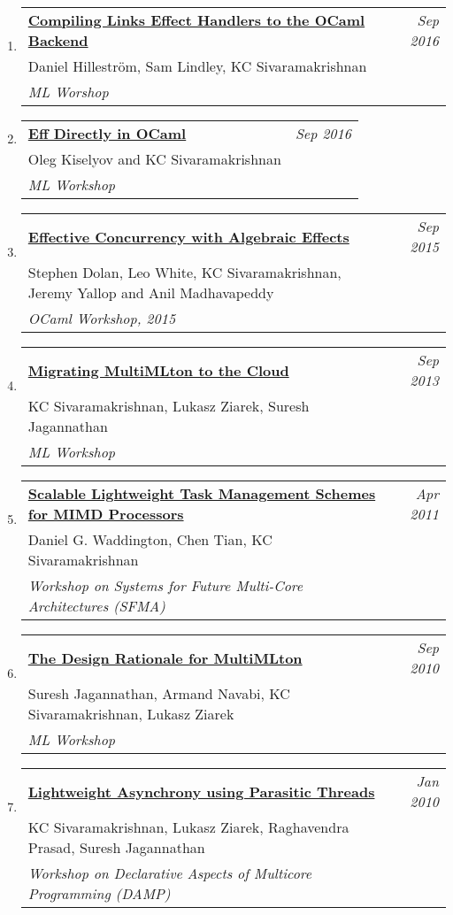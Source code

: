 \documentclass[10pt]{article}
\makeatletter
\newcommand{\lbar}[1]{{\color{#1}\ding{118}}\hspace*{2pt}}
\newenvironment{benumerate}[2]{
    \let\oldItem\item
    \def\item{\addtocounter{enumi}{-2}\oldItem}
    \begin{enumerate}[#2] \itemsep3pt
    \setcounter{enumi}{#1}
    \addtocounter{enumi}{1}}
  {\end{enumerate}}
\newenvironment{publication}[5]
{ \item
  \begin{tabular*}{7.5in}{p{6.3in}@{\extracolsep{\fill}}r}
    \href{#1}{\textbf{#2}} & \textit{#3}\\ #4 &\\ \textit{#5}&\\
  \end{tabular*}
} {}
\newenvironment{region}[3]{%
  \vspace*{0.5ex}
  {\scalebox{1.4}{\textbf{#1}}}
  \begin{benumerate}{#3}{\color{RoyalBlue}#2}}
  {\end{benumerate}\vspace{0.8ex}}
\makeatother
\begin{document}
\begin{region} {\lbar{purple}Workshop Publications}{{W}1}{21}
  \begin{publication}{http://kcsrk.info/papers/links_ocaml_ml16.pdf}
    {Compiling Links Effect Handlers to the OCaml Backend}
    {Sep 2016}{Daniel Hilleström, Sam Lindley, KC Sivaramakrishnan}
    {ML Worshop}
  \end{publication}

  \begin{publication}{http://kcsrk.info/papers/eff_ocaml_ml16.pdf}
    {Eff Directly in OCaml}
    {Sep 2016}{Oleg Kiselyov and KC Sivaramakrishnan}
    {ML Workshop}
  \end{publication}

  \begin{publication}{http://kcsrk.info/papers/effects_ocaml15.pdf}
    {Effective Concurrency with Algebraic Effects}
    {Sep 2015}{Stephen Dolan, Leo White, KC Sivaramakrishnan, Jeremy Yallop and Anil Madhavapeddy}
    {OCaml Workshop, 2015}
  \end{publication}

  \begin{publication}{http://kcsrk.info/papers/mmcloud_mlw13.pdf}
    {Migrating MultiMLton to the Cloud}
    {Sep 2013}{KC Sivaramakrishnan, Lukasz Ziarek, Suresh Jagannathan}
    {ML Workshop}
  \end{publication}

  \begin{publication}{http://kcsrk.info/papers/snapple_sfma11.pdf}
    {Scalable Lightweight Task Management Schemes for MIMD Processors}
    {Apr 2011}{Daniel G. Waddington, Chen Tian, KC Sivaramakrishnan}
    {Workshop on Systems for Future Multi-Core Architectures (SFMA)}
  \end{publication}

  \begin{publication}{http://kcsrk.info/papers/multimlton_mlw10.pdf}
    {The Design Rationale for MultiMLton}
    {Sep 2010}{Suresh Jagannathan, Armand Navabi, KC Sivaramakrishnan, Lukasz Ziarek}
    {ML Workshop}
  \end{publication}

  \begin{publication}{http://kcsrk.info/papers/parasites_damp10.pdf}
    {Lightweight Asynchrony using Parasitic Threads}
    {Jan 2010}{KC Sivaramakrishnan, Lukasz Ziarek, Raghavendra Prasad, Suresh Jagannathan}
    {Workshop on Declarative Aspects of Multicore Programming (DAMP)}
  \end{publication}
\end{region}
\end{document}
